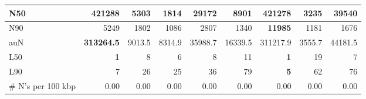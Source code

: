 \documentclass[12pt,a4paper]{article}
\begin{document}
\begin{table}[ht]
\begin{center}
\begin{tabular}{|l*{8}{|r}|}
N50 & {\bf 421288} & 5303 & 1814 & 29172 & 8901 & 421278 & 3235 & 39540 \\ \hline
N90 & 5249 & 1802 & 1086 & 2807 & 1340 & {\bf 11985} & 1181 & 1676 \\ \hline
auN & {\bf 313264.5} & 9013.5 & 8314.9 & 35988.7 & 16339.5 & 311217.9 & 3555.7 & 44181.5 \\ \hline
L50 & {\bf 1} & 8 & 6 & 8 & 11 & {\bf 1} & 19 & 7 \\ \hline
L90 & 7 & 26 & 25 & 36 & 79 & {\bf 5} & 62 & 76 \\ \hline
\# N's per 100 kbp & 0.00 & 0.00 & 0.00 & 0.00 & 0.00 & 0.00 & 0.00 & 0.00 \\ \hline
\end{tabular}
\end{center}
\end{table}
\end{document}
